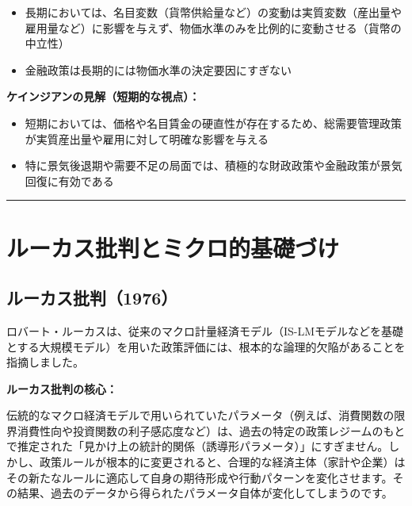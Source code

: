 \documentclass[
  japanese,
  lualatex,
  ja=standard,
  12pt,
  a4paper]{ltjsarticle}
\providecommand{\tightlist}{%
  \setlength{\itemsep}{0pt}\setlength{\parskip}{0pt}}
\begin{document}
\begin{itemize}
\tightlist
\item
  長期においては、名目変数（貨幣供給量など）の変動は実質変数（産出量や雇用量など）に影響を与えず、物価水準のみを比例的に変動させる（貨幣の中立性）
\item
  金融政策は長期的には物価水準の決定要因にすぎない
\end{itemize}


\textbf{ケインジアンの見解（短期的な視点）：}

\begin{itemize}
\tightlist
\item
  短期においては、価格や名目賃金の硬直性が存在するため、総需要管理政策が実質産出量や雇用に対して明確な影響を与える
\item
  特に景気後退期や需要不足の局面では、積極的な財政政策や金融政策が景気回復に有効である
\end{itemize}

\begin{center}\rule{0.5\linewidth}{0.5pt}\end{center}

\section{ルーカス批判とミクロ的基礎づけ}\label{ux30ebux30fcux30abux30b9ux6279ux5224ux3068ux30dfux30afux30edux7684ux57faux790eux3065ux3051}

\subsection{ルーカス批判（1976）}\label{ux30ebux30fcux30abux30b9ux6279ux52241976}

ロバート・ルーカスは、従来のマクロ計量経済モデル（IS-LMモデルなどを基礎とする大規模モデル）を用いた政策評価には、根本的な論理的欠陥があることを指摘しました。


\textbf{ルーカス批判の核心：}

伝統的なマクロ経済モデルで用いられていたパラメータ（例えば、消費関数の限界消費性向や投資関数の利子感応度など）は、過去の特定の政策レジームのもとで推定された「見かけ上の統計的関係（誘導形パラメータ）」にすぎません。しかし、政策ルールが根本的に変更されると、合理的な経済主体（家計や企業）はその新たなルールに適応して自身の期待形成や行動パターンを変化させます。その結果、過去のデータから得られたパラメータ自体が変化してしまうのです。
\end{document}
